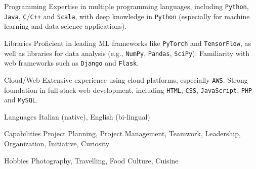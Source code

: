

\begin{cvskills}
  \cvskill
    {Programming}
    {Expertise in multiple programming languages, including \texttt{Python}, \texttt{Java}, \texttt{C}/\texttt{C++} and \texttt{Scala}, with deep knowledge in \texttt{Python} (especially for machine learning and data science applications).}

  \cvskill
    {Libraries}
    {Proficient in leading ML frameworks like \texttt{PyTorch} and \texttt{TensorFlow}, as well as libraries for data analysis (e.g., \texttt{NumPy}, \texttt{Pandas}, \texttt{SciPy}). Familiarity with web frameworks such as \texttt{Django} and \texttt{Flask}.}

  \cvskill
    {Cloud/Web}
    {Extensive experience using cloud platforms, especially \texttt{AWS}. Strong foundation in full-stack web development, including \texttt{HTML}, \texttt{CSS}, \texttt{JavaScript}, \texttt{PHP} and \texttt{MySQL}.}
\end{cvskills}



\begin{cvskills}
  \hspace{4.0mm}
  \cvskill
    {Languages}
    {Italian (native), English (bi-lingual)}
  
  \cvskill
    {Capabilities}
    {Project Planning, Project Management, Teamwork, Leadership, Organization, Initiative, Curiosity}

  \cvskill
    {Hobbies}
    {Photography, Travelling, Food Culture, Cuisine}
\end{cvskills}
